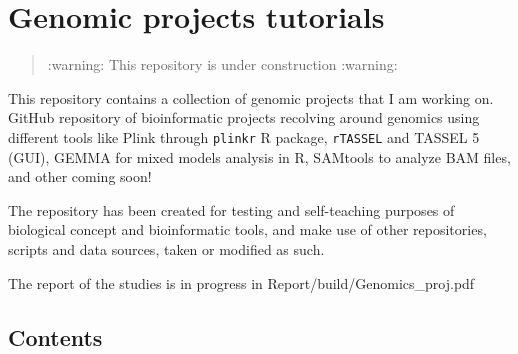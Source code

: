 

\hypertarget{genomic-projects-tutorials}{%
  \section{Genomic projects tutorials}\label{genomic-projects-tutorials}}

\begin{quote}
  :warning: This repository is under construction :warning:
\end{quote}

This repository contains a collection of genomic projects that I am
working on. GitHub repository of bioinformatic projects recolving around
genomics using different tools like Plink through \texttt{plinkr} R
package, \texttt{rTASSEL} and TASSEL 5 (GUI), GEMMA for mixed models
analysis in R, SAMtools to analyze BAM files, and other coming soon!

The repository has been created for testing and self-teaching purposes
of biological concept and bioinformatic tools, and make use of other
repositories, scripts and data sources, taken or modified as such.

The report of the studies is in progress in
Report/build/Genomics\_proj.pdf

\hypertarget{contents}{%
  \subsection{Contents}\label{contents}}

